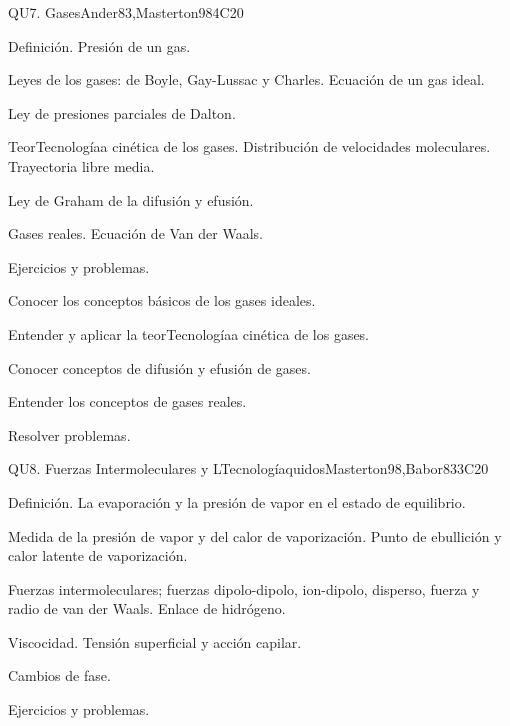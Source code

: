 \begin{syllabus}
\begin{unit}{QU7. Gases}{}{Ander83,Masterton98}{4}{C20}
\begin{topics}
      \item Definición. Presión de un gas.
      \item Leyes de los gases: de Boyle, Gay-Lussac y Charles. Ecuación de un gas ideal.
      \item Ley de presiones parciales de Dalton.
      \item TeorTecnologíaa cinética de los gases. Distribución de velocidades moleculares. Trayectoria libre media.
      \item Ley de Graham de la difusión y efusión.
      \item Gases reales. Ecuación de Van der Waals.
      \item Ejercicios y problemas.
   \end{topics}

   \begin{learningoutcomes}
      \item Conocer los conceptos básicos de los gases ideales.
      \item Entender y aplicar la teorTecnologíaa cinética de los gases.
      \item Conocer conceptos de difusión y efusión de gases.
      \item Entender los conceptos de gases reales.
      \item Resolver problemas.
   \end{learningoutcomes}
\end{unit}

\begin{unit}{QU8. Fuerzas Intermoleculares y LTecnologíaquidos}{}{Masterton98,Babor83}{3}{C20}
\begin{topics}
      \item Definición. La evaporación y la presión de vapor en el estado de equilibrio.
      \item Medida de la presión de vapor y del calor de vaporización. Punto de ebullición y calor latente de vaporización.
      \item Fuerzas intermoleculares; fuerzas dipolo-dipolo, ion-dipolo, disperso, fuerza y radio de van der Waals. Enlace de hidrógeno.
      \item Viscocidad. Tensión superficial y acción capilar.
      \item Cambios de fase.
      \item Ejercicios y problemas.
    \end{topics}


\end{unit}
\end{syllabus}
